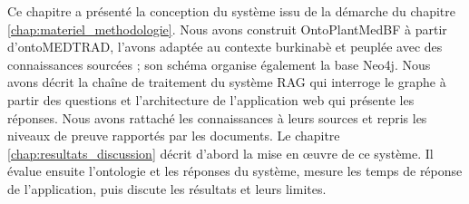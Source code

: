 Ce chapitre a présenté la conception du système issu de la démarche du chapitre \ref{chap:materiel_methodologie}. Nous avons construit OntoPlantMedBF à partir d'ontoMEDTRAD, l'avons adaptée au contexte burkinabè et peuplée avec des connaissances sourcées ; son schéma organise également la base Neo4j. Nous avons décrit la chaîne de traitement du système RAG qui interroge le graphe à partir des questions et l'architecture de l'application web qui présente les réponses. Nous avons rattaché les connaissances à leurs sources et repris les niveaux de preuve rapportés par les documents. Le chapitre \ref{chap:resultats_discussion} décrit d'abord la mise en œuvre de ce système. Il évalue ensuite l'ontologie et les réponses du système, mesure les temps de réponse de l'application, puis discute les résultats et leurs limites.
